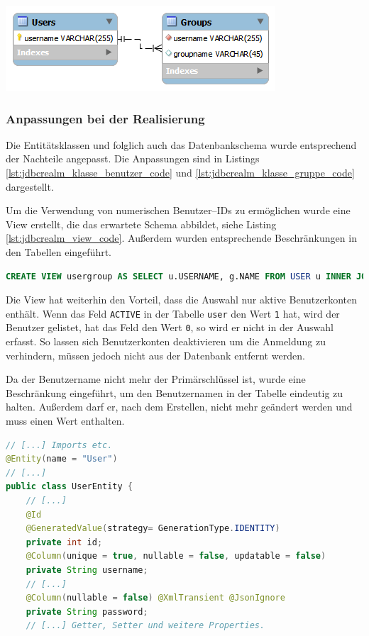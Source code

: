 \begin{minipage}[t]{\textwidth}
	\centering
	\includegraphics[scale = .75]{img/jdbcrealm_schema}
	\label{fig:jdbcrealm_minimal_schema}
\end{minipage}

\subsubsection{Anpassungen bei der Realisierung}

Die Entitätsklassen und folglich auch das Datenbankschema wurde entsprechend der Nachteile angepasst.
Die Anpassungen sind in Listings \ref{lst:jdbcrealm_klasse_benutzer_code} und \ref{lst:jdbcrealm_klasse_gruppe_code} dargestellt.

Um die Verwendung von numerischen Benutzer--IDs zu ermöglichen wurde eine View erstellt, die das erwartete Schema abbildet, siehe Listing \ref{lst:jdbcrealm_view_code}.
Außerdem wurden entsprechende Beschränkungen in den Tabellen eingeführt.
\begin{lstlisting}[language=SQL,caption={SQL Befehl zum erstellen einer View mit Benutzername und Gruppenname}, label=lst:jdbcrealm_view_code]
CREATE VIEW usergroup AS SELECT u.USERNAME, g.NAME FROM USER u INNER JOIN realmgroup g on g.USER_ID = u.ID WHERE u.ACTIVE=1;
\end{lstlisting}
Die View hat weiterhin den Vorteil, dass die Auswahl nur aktive Benutzerkonten enthält.
Wenn das Feld \texttt{ACTIVE} in der Tabelle \texttt{user} den Wert \texttt{1} hat, wird der Benutzer gelistet, hat das Feld den Wert \texttt{0}, so wird er nicht in der Auswahl erfasst.
So lassen sich Benutzerkonten deaktivieren um die Anmeldung zu verhindern, müssen jedoch nicht aus der Datenbank entfernt werden.

Da der Benutzername nicht mehr der Primärschlüssel ist, wurde eine Beschränkung eingeführt, um den Benutzernamen in der Tabelle eindeutig zu halten.
Außerdem darf er, nach dem Erstellen, nicht mehr geändert werden und muss einen Wert enthalten.
\begin{lstlisting}[language=Java,caption={Beispiel für eine UserEntity Klasse.}, label=lst:jdbcrealm_klasse_benutzer_code]
// [...] Imports etc.
@Entity(name = "User")
// [...]
public class UserEntity {
	// [...]
    @Id
    @GeneratedValue(strategy= GenerationType.IDENTITY)
    private int id;
    @Column(unique = true, nullable = false, updatable = false)
    private String username;
    // [...]
    @Column(nullable = false) @XmlTransient @JsonIgnore
    private String password;
    // [...] Getter, Setter und weitere Properties.
\end{lstlisting}

